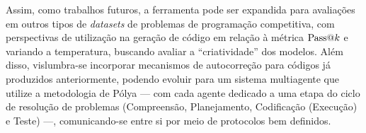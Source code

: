 Assim, como trabalhos futuros, a ferramenta pode ser expandida para avaliações em outros tipos de \textit{datasets} de problemas de programação competitiva, com perspectivas de utilização na geração de código em relação à métrica $\mathrm{Pass@}k$ e variando a temperatura, buscando avaliar a ``criatividade'' dos modelos. Além disso, vislumbra-se incorporar mecanismos de autocorreção para códigos já produzidos anteriormente, podendo evoluir para um sistema multiagente que utilize a metodologia de Pólya --- com cada agente dedicado a uma etapa do ciclo de resolução de problemas (Compreensão, Planejamento, Codificação (Execução) e Teste) ---, comunicando-se entre si por meio de protocolos bem definidos.
